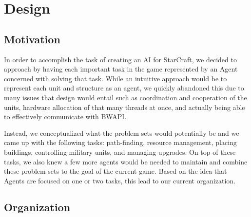 \documentclass[letterpaper]{article}
\begin{document}
\section{Design}
\subsection{Motivation}
In order to accomplish the task of creating an AI for StarCraft, we decided to approach by having each important task in the game represented by an Agent concerned with solving that task.  While an intuitive approach would be to represent each unit and structure as an agent, we quickly abandoned this due to many issues that design would entail such as coordination and cooperation of the units,  hardware allocation of that many threads at once, and actually being able to effectively communicate with BWAPI.

Instead, we conceptualized what the problem sets would potentially be and we came up with the following tasks: path-finding, resource management, placing buildings, controlling military units, and managing upgrades.  On top of these tasks, we also knew a few more agents would be needed to maintain and combine these problem sets to the goal of the current game.  Based on the idea that Agents are focused on one or two tasks, this lead to our current organization.   

\subsection{Organization}
\end{document}
